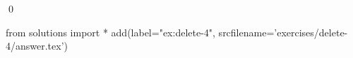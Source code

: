 
\begin{ex} 
  \label{ex:delete-4}
  
  \qed
\end{ex} 
\begin{python0}
from solutions import *
add(label="ex:delete-4",
    srcfilename='exercises/delete-4/answer.tex') 
\end{python0}
